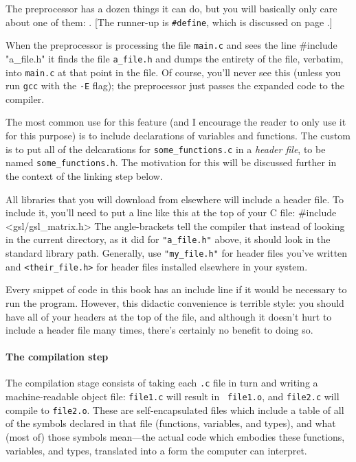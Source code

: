 \documentclass[12pt]{article}
\makeatletter
\def\ind#1{\index{#1}#1}
\def\ttind#1{\index{#1@{\tt #1}}{\tt #1}}
\makeatother
\begin{document}
The preprocessor has a dozen things it can do, but you will basically only care about one of them: \ttind{\#include}. 
[The runner-up is {\tt \#define}, which is discussed on page \pageref{macros}.]

When the preprocessor is processing the file {\tt main.c} and sees the line
#include "a_file.h"
it finds the file {\tt a\_file.h} and dumps the entirety of the file,
verbatim, into {\tt main.c} at that point in the file. Of course, you'll
never see this (unless you run {\tt gcc} with the {\tt -E} flag); the
preprocessor just passes the expanded code to the compiler.

The most common use for this feature (and I encourage the reader to
only use it for this purpose) is to include declarations of variables
and functions. The custom is to put all of the delcarations for {\tt some\_functions.c} in a {\sl \ind{header file}}, to be named {\tt some\_functions.h}.
The motivation for this will be discussed further in the context of the
linking step below.  

All libraries that you will download from elsewhere will include a header file.
To include it, you'll need to put a line like this at the top of your C file:
#include <gsl/gsl_matrix.h>
The angle-brackets tell the compiler that instead of looking in the
current directory, as it did for {\tt "a\_file.h"} above, it should
look in the standard library path. Generally, use {\tt "my\_file.h"} for
header files you've written and {\tt <their\_file.h>} for header files installed elsewhere
in your system.

Every snippet of code in this book has an include line if it would be
necessary to run the program.  However, this didactic convenience is
terrible style: you should have all of your headers at the top of the
file, and although it doesn't hurt to include a header file many times,
there's certainly no benefit to doing so.


\paragraph{The compilation step} 
The \ind{compilation}
stage consists of taking each {\tt .c} file in turn and writing
a machine-readable object file: {\tt file1.c} will result in {\tt
file1.o}, and {\tt file2.c} will compile to {\tt file2.o}. These  are
self-encapsulated files which include a table of all of the symbols
declared in that file (functions, variables, and types), and what (most of) those
symbols mean---the actual code which embodies these functions, variables,
and types, translated into a form the computer can interpret.
\end{document}

